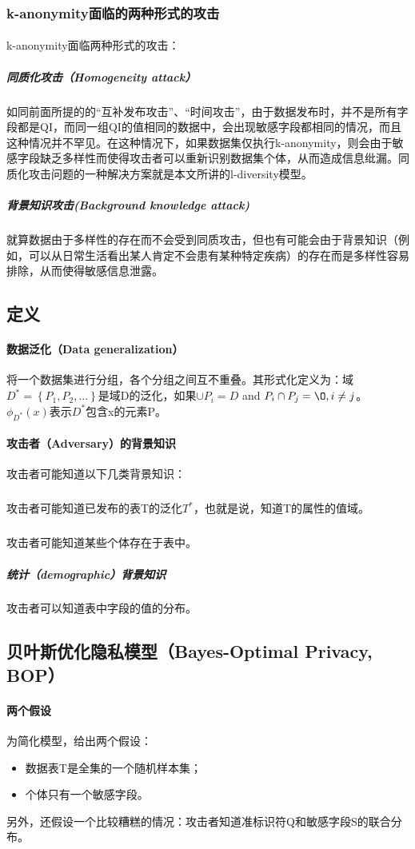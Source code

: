 \documentclass[12pt,a4paper]{article}
\begin{document}
\subsubsection{k-anonymity面临的两种形式的攻击}
\paragraph{} k-anonymity面临两种形式的攻击：
	\subparagraph{同质化攻击（Homogeneity attack）} 如同前面所提的的“互补发布攻击”、“时间攻击”，由于数据发布时，并不是所有字段都是QI，而同一组QI的值相同的数据中，会出现敏感字段都相同的情况，而且这种情况并不罕见。在这种情况下，如果数据集仅执行k-anonymity，则会由于敏感字段缺乏多样性而使得攻击者可以重新识别数据集个体，从而造成信息纰漏。同质化攻击问题的一种解决方案就是本文所讲的l-diversity模型。
	\subparagraph{背景知识攻击(Background knowledge attack)} 就算数据由于多样性的存在而不会受到同质攻击，但也有可能会由于背景知识（例如，可以从日常生活看出某人肯定不会患有某种特定疾病）的存在而是多样性容易排除，从而使得敏感信息泄露。
	
\subsection{定义}
\paragraph{数据泛化（Data generalization）} 将一个数据集进行分组，各个分组之间互不重叠。其形式化定义为：域$D^*=\left \{P_1,P_2,...\right \}$是域D的泛化，如果$\cup P_i = D$ and $P_i \cap P_j = \O, i \neq j $。$\phi_{D^*}(x)$表示$D^*$包含x的元素P。

\paragraph{攻击者（Adversary）的背景知识} 攻击者可能知道以下几类背景知识：
	\subparagraph{} 攻击者可能知道已发布的表T的泛化$T^*$，也就是说，知道T的属性的值域。
	\subparagraph{} 攻击者可能知道某些个体存在于表中。
	\subparagraph{统计（demographic）背景知识} 攻击者可以知道表中字段的值的分布。

\subsection{贝叶斯优化隐私模型（Bayes-Optimal Privacy, BOP）}
\paragraph{两个假设} 为简化模型，给出两个假设：
\begin{itemize}
	\item 数据表T是全集的一个随机样本集；
	\item 个体只有一个敏感字段。
\end{itemize}
另外，还假设一个比较糟糕的情况：攻击者知道准标识符Q和敏感字段S的联合分布。
\end{document}
